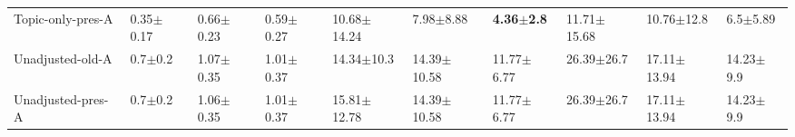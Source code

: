 \begin{tabular}{llllllllll}
Topic-only-pres-A   &           0.35$\pm$0.17 &         0.66$\pm$0.23 &           0.59$\pm$0.27 &        10.68$\pm$14.24 &           7.98$\pm$8.88 &  \textbf{4.36$\pm$2.8} &         11.71$\pm$15.68 &          10.76$\pm$12.8 &            6.5$\pm$5.89 \\
Unadjusted-old-A    &             0.7$\pm$0.2 &         1.07$\pm$0.35 &           1.01$\pm$0.37 &         14.34$\pm$10.3 &         14.39$\pm$10.58 &         11.77$\pm$6.77 &          26.39$\pm$26.7 &         17.11$\pm$13.94 &           14.23$\pm$9.9 \\
Unadjusted-pres-A   &             0.7$\pm$0.2 &         1.06$\pm$0.35 &           1.01$\pm$0.37 &        15.81$\pm$12.78 &         14.39$\pm$10.58 &         11.77$\pm$6.77 &          26.39$\pm$26.7 &         17.11$\pm$13.94 &           14.23$\pm$9.9 \\
\bottomrule
\end{tabular}

